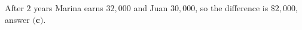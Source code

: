 After $2$ years Marina earns $32{,}000$ and Juan $30{,}000$, so the difference is $\boxed{\$2{,}000}$, answer $\textbf{(c)}$.
